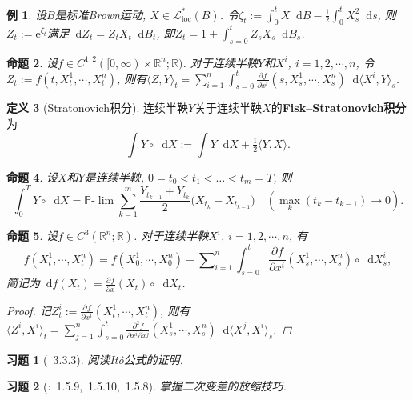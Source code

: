 \documentclass{ctexart}
\theoremstyle{definition}
\newtheorem{Def}{定义}[section]
\theoremstyle{remark}
\theoremstyle{plain}
\newtheorem{Prop}[Def]{命题}
\newtheorem{Eg}[Def]{例}
\newtheorem{Ex}{习题}[section]
\newcommand{\1}{\mathbbm{1}}				%
\renewcommand{\P}{\mathbb{P}}				%
\newcommand{\agp}[1]{\langle #1 \rangle}	%
\newcommand{\R}{\mathbb{R}}					%
\newcommand{\tint}{\textstyle\int\nolimits}
\newcommand{\tsum}{\textstyle\sum\nolimits}
\renewcommand*{\d}{\mathop{}\!\mathrm{d}}	%
\newcommand{\pd}{\partial}					%
\newcommand{\p}[3][]{\frac{\pd^{#1}#2}{\pd{#3}^{#1}}}%
\newcommand{\e}{\mathrm{e}}
\begin{document}
\begin{Eg}
设$B$是标准Brown运动, $X \in \mathcal{L}^{*}_{\mathrm{loc}}(B)$. 令$\zeta_{t} := \int_{0}^{t} X \d B - \frac{1}{2}\int_{0}^{t} X_{s}^{2} \d s$, 则$Z_{t} := \e^{\zeta_{t}}$满足$\d Z_{t} = Z_{t}X_{t} \d B_{t}$, 即$Z_{t} = 1 + \int_{s=0}^{t} Z_{s}X_{s} \d B_{s}$.
\end{Eg}

\begin{Prop}
设$f \in C^{1,2}([0,\infty)\times\R^{n};\R)$. 对于连续半鞅$Y$和$X^{i}$, $i = 1,2,\cdots,n$, 令$Z_{t} := f(t,X^{1}_{t},\cdots,X^{n}_{t})$, 则有$\agp{Z,Y}_{t} = \sum_{i=1}^{n}\int_{s=0}^{t}\p{f}{x^i}(s,X^{1}_{s},\cdots,X^{n}_{s}) \d\agp{X^{i},Y}_{s}$.
\end{Prop}

\begin{Def}[Stratonovich积分]
连续半鞅$Y$关于连续半鞅$X$的\textbf{Fisk--Stratonovich积分}为
\[ \tint Y \circ\d X := \tint Y \d X + \tfrac{1}{2}\agp{Y,X} . \]
\end{Def}

\begin{Prop}
设$X$和$Y$是连续半鞅, $0 = t_{0} < t_{1} < \dots < t_{m} = T$, 则
\[ \int_{0}^{T} Y \circ\d X = \P\text{-}\lim \sum_{k=1}^{m} \frac{Y_{t_{k-1}}+Y_{t_k}}{2} \big(X_{t_k}-X_{t_{k-1}}\big) \quad (\max_{k}(t_{k}-t_{k-1}) \to 0) . \]
\end{Prop}

\begin{Prop}
设$f \in C^{3}(\R^{n};\R)$. 对于连续半鞅$X^{i}$, $i = 1,2,\cdots,n$, 有
\[ f(X^{1}_{t},\cdots,X^{n}_{t}) = f(X^{1}_{0},\cdots,X^{n}_{0}) + \tsum_{i=1}^{n}\int_{s=0}^{t} \p{f}{x^i}(X^{1}_{s},\cdots,X^{n}_{s}) \circ\d X^{i}_{s} , \]
简记为$\d f(X_{t}) = \p{f}{x}(X_{t}) \circ\d X_{t}$.
\begin{proof}
记$Z^{i}_{t} := \p{f}{x^i}(X^{1}_{t},\cdots,X^{n}_{t})$, 则有$\agp{Z^{i},X^{i}}_{t} = \sum_{j=1}^{n}\int_{s=0}^{t}\frac{\pd^{2}f}{\pd{x^i}\pd{x^j}}(X^{1}_{s},\cdots,X^{n}_{s}) \d\agp{X^{j},X^{i}}_{s}$.
\end{proof}
\end{Prop}


\begin{Ex}[\cite{Karatzas-Shreve--GTM113}~3.3.3]
阅读It\^{o}公式的证明.
\end{Ex}

\begin{Ex}[\cite{Karatzas-Shreve--GTM113}:~1.5.9,~1.5.10,~1.5.8]
掌握二次变差的放缩技巧.
\end{Ex}
\end{document}
